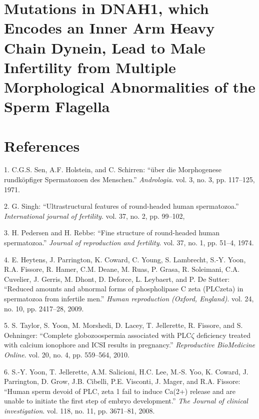\documentclass[12pt,twoside]{ugathesis}
\begin{document}
\chapter{Mutations in DNAH1, which Encodes an Inner Arm Heavy Chain
Dynein, Lead to Male Infertility from Multiple Morphological
Abnormalities of the Sperm Flagella}\label{dnah12014}

\chapter*{References}\label{references}

\hypertarget{refs}{}
\hypertarget{ref-Sen2009}{}
1. C.G.S. Sen, A.F. Holstein, and C. Schirren: ``über die Morphogenese
rundköpfiger Spermatozoen des Menschen.'' \emph{Andrologia}. vol. 3, no.
3, pp. 117--125, 1971.

\hypertarget{ref-Singh}{}
2. G. Singh: ``Ultrastructural features of round-headed human
spermatozoa.'' \emph{International journal of fertility}. vol. 37, no.
2, pp. 99--102,

\hypertarget{ref-Pedersen1974}{}
3. H. Pedersen and H. Rebbe: ``Fine structure of round-headed human
spermatozoa.'' \emph{Journal of reproduction and fertility}. vol. 37,
no. 1, pp. 51--4, 1974.

\hypertarget{ref-Heytens2009}{}
4. E. Heytens, J. Parrington, K. Coward, C. Young, S. Lambrecht, S.-Y.
Yoon, R.A. Fissore, R. Hamer, C.M. Deane, M. Ruas, P. Grasa, R.
Soleimani, C.A. Cuvelier, J. Gerris, M. Dhont, D. Deforce, L. Leybaert,
and P. De Sutter: ``Reduced amounts and abnormal forms of phospholipase
C zeta (PLCzeta) in spermatozoa from infertile men.'' \emph{Human
reproduction (Oxford, England)}. vol. 24, no. 10, pp. 2417--28, 2009.

\hypertarget{ref-Taylor2010}{}
5. S. Taylor, S. Yoon, M. Morshedi, D. Lacey, T. Jellerette, R. Fissore,
and S. Oehninger: ``Complete globozoospermia associated with
PLC\(\zeta\) deficiency treated with calcium ionophore and ICSI results
in pregnancy.'' \emph{Reproductive BioMedicine Online}. vol. 20, no. 4,
pp. 559--564, 2010.

\hypertarget{ref-Yoon2008}{}
6. S.-Y. Yoon, T. Jellerette, A.M. Salicioni, H.C. Lee, M.-S. Yoo, K.
Coward, J. Parrington, D. Grow, J.B. Cibelli, P.E. Visconti, J. Mager,
and R.A. Fissore: ``Human sperm devoid of PLC, zeta 1 fail to induce
Ca(2+) release and are unable to initiate the first step of embryo
development.'' \emph{The Journal of clinical investigation}. vol. 118,
no. 11, pp. 3671--81, 2008.
\end{document}
